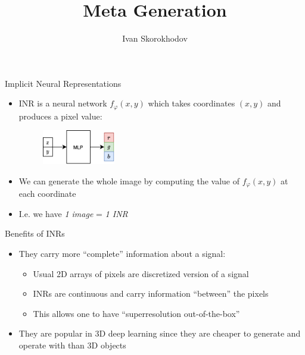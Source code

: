 \documentclass[10pt, handout]{beamer}
\title{Meta Generation}
\author{Ivan Skorokhodov}
\begin{document}
\begin{frame}
    \titlepage
\end{frame}


\begin{frame}{Implicit Neural Representations}
\begin{itemize}
    \item\pause INR is a neural network $f_\varphi(x,y)$ which takes coordinates $(x,y)$ and produces a pixel value:
    \begin{figure}
        \centering
        \includegraphics[width=0.3\textwidth]{images/inr}
    \end{figure}
    \item\pause We can generate the whole image by computing the value of $f_\varphi(x,y)$ at each coordinate
    \item\pause I.e. we have \textit{1 image} = \textit{1 INR}
\end{itemize}
\end{frame}


\begin{frame}{Benefits of INRs}
    \begin{itemize}
        \item\pause They carry more ``complete'' information about a signal:
        \begin{itemize}
            \item Usual 2D arrays of pixels are discretized version of a signal
            \item INRs are continuous and carry information ``between'' the pixels
            \item This allows one to have ``superresolution out-of-the-box''
        \end{itemize}
        \item\pause They are popular in 3D deep learning since they are cheaper to generate and operate with than 3D objects
    \end{itemize}
\end{frame}
\end{document}
